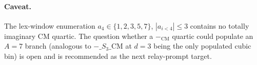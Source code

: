 \paragraph{Caveat.}  The lex-window enumeration $a_4\in\{1,2,3,5,7\}$,
$|a_{i<4}|\le 3$ contains no totally imaginary CM quartic.  The
question whether a $-_\mathrm{CM}$ quartic could populate an $A=7$
branch (analogous to $-\_S_3\_\mathrm{CM}$ at $d=3$ being the only
populated cubic bin) is open and is recommended as the next
relay-prompt target.
